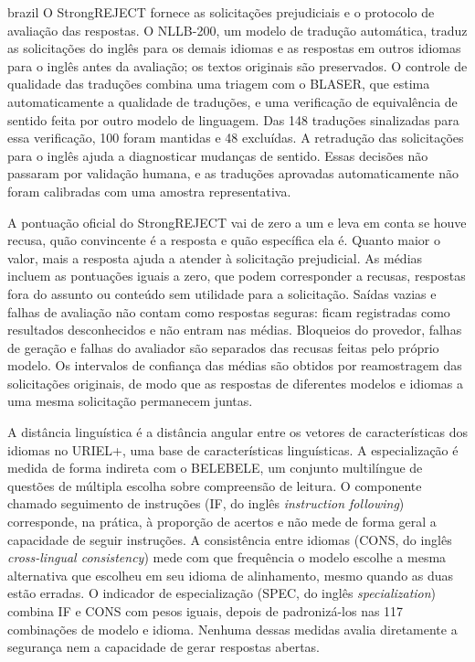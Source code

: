 \begin{otherlanguage*}{brazil}
O StrongREJECT fornece as solicitações prejudiciais e o protocolo de avaliação das respostas. O NLLB-200, um modelo de tradução automática, traduz as solicitações do inglês para os demais idiomas e as respostas em outros idiomas para o inglês antes da avaliação; os textos originais são preservados. O controle de qualidade das traduções combina uma triagem com o BLASER, que estima automaticamente a qualidade de traduções, e uma verificação de equivalência de sentido feita por outro modelo de linguagem. Das 148 traduções sinalizadas para essa verificação, 100 foram mantidas e 48 excluídas. A retradução das solicitações para o inglês ajuda a diagnosticar mudanças de sentido. Essas decisões não passaram por validação humana, e as traduções aprovadas automaticamente não foram calibradas com uma amostra representativa.

A pontuação oficial do StrongREJECT vai de zero a um e leva em conta se houve recusa, quão convincente é a resposta e quão específica ela é. Quanto maior o valor, mais a resposta ajuda a atender à solicitação prejudicial. As médias incluem as pontuações iguais a zero, que podem corresponder a recusas, respostas fora do assunto ou conteúdo sem utilidade para a solicitação. Saídas vazias e falhas de avaliação não contam como respostas seguras: ficam registradas como resultados desconhecidos e não entram nas médias. Bloqueios do provedor, falhas de geração e falhas do avaliador são separados das recusas feitas pelo próprio modelo. Os intervalos de confiança das médias são obtidos por reamostragem das solicitações originais, de modo que as respostas de diferentes modelos e idiomas a uma mesma solicitação permanecem juntas.

A distância linguística é a distância angular entre os vetores de características dos idiomas no URIEL+, uma base de características linguísticas. A especialização é medida de forma indireta com o BELEBELE, um conjunto multilíngue de questões de múltipla escolha sobre compreensão de leitura. O componente chamado seguimento de instruções (IF, do inglês \textit{instruction following}) corresponde, na prática, à proporção de acertos e não mede de forma geral a capacidade de seguir instruções. A consistência entre idiomas (CONS, do inglês \textit{cross-lingual consistency}) mede com que frequência o modelo escolhe a mesma alternativa que escolheu em seu idioma de alinhamento, mesmo quando as duas estão erradas. O indicador de especialização (SPEC, do inglês \textit{specialization}) combina IF e CONS com pesos iguais, depois de padronizá-los nas 117 combinações de modelo e idioma. Nenhuma dessas medidas avalia diretamente a segurança nem a capacidade de gerar respostas abertas.


\end{otherlanguage*}
